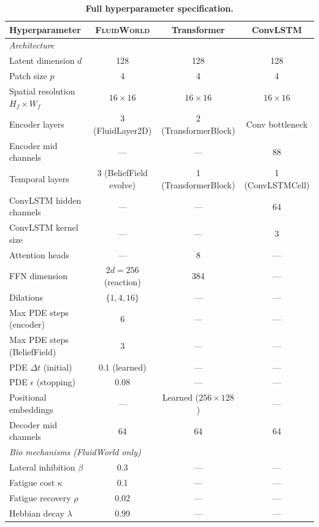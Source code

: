 \documentclass{article}
\newcommand{\fluidworld}{\textsc{FluidWorld}}
\begin{document}
\begin{table}[h]
    \centering
    \caption{\textbf{Full hyperparameter specification.}}
    \label{tab:hyperparams}
    \begin{tabular}{lccc}
        \toprule
        \textbf{Hyperparameter} & \textbf{\fluidworld{}} & \textbf{Transformer} & \textbf{ConvLSTM} \\
        \midrule
        \multicolumn{4}{l}{\emph{Architecture}} \\
        Latent dimension $d$ & 128 & 128 & 128 \\
        Patch size $p$ & 4 & 4 & 4 \\
        Spatial resolution $H_f \times W_f$ & $16 \times 16$ & $16 \times 16$ & $16 \times 16$ \\
        Encoder layers & 3 (FluidLayer2D) & 2 (TransformerBlock) & Conv bottleneck \\
        Encoder mid channels & --- & --- & 88 \\
        Temporal layers & 3 (BeliefField evolve) & 1 (TransformerBlock) & 1 (ConvLSTMCell) \\
        ConvLSTM hidden channels & --- & --- & 64 \\
        ConvLSTM kernel size & --- & --- & 3 \\
        Attention heads & --- & 8 & --- \\
        FFN dimension & $2d = 256$ (reaction) & 384 & --- \\
        Dilations & $\{1, 4, 16\}$ & --- & --- \\
        Max PDE steps (encoder) & 6 & --- & --- \\
        Max PDE steps (BeliefField) & 3 & --- & --- \\
        PDE $\Delta t$ (initial) & 0.1 (learned) & --- & --- \\
        PDE $\epsilon$ (stopping) & 0.08 & --- & --- \\
        Positional embeddings & --- & Learned ($256 \times 128$) & --- \\
        Decoder mid channels & 64 & 64 & 64 \\
        \midrule
        \multicolumn{4}{l}{\emph{Bio mechanisms (FluidWorld only)}} \\
        Lateral inhibition $\beta$ & 0.3 & --- & --- \\
        Fatigue cost $\kappa$ & 0.1 & --- & --- \\
        Fatigue recovery $\rho$ & 0.02 & --- & --- \\
        Hebbian decay $\lambda$ & 0.99 & --- & --- \\

\end{tabular}
\end{table}
\end{document}
